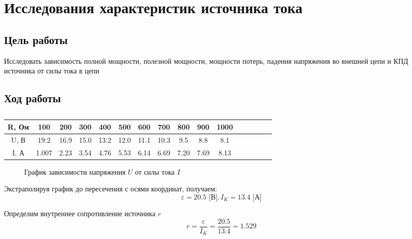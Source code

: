 \chapter{Исследования характеристик источника тока}

\section{Цель работы}
Исследовать зависимость полной мощности, полезной мощности, мощности потерь, падения напряжения во внешней цепи и КПД источника от силы тока в цепи

\section{Ход работы}

\begin{table}[h]
	\caption{}
	\centering
	\begin{tabular}{|c|c|c|c|c|c|c|c|c|c|c|c|c|c|c|c|}
		\hline
		R, Ом & 100 & 200 & 300 & 400 & 500 & 600 & 700 & 800 & 900 & 1000 \\ \hline
		U, В & 19.2 & 16.9 & 15.0 & 13.2 & 12.0 & 11.1 & 10.3 & 9.5 & 8.8 & 8.1 \\ \hline
		I, А & 1.007 & 2.23 & 3.54 & 4.76 & 5.53 & 6.14 & 6.69 & 7.20 & 7.69 & 8.13    \\ \hline
	\end{tabular}
\end{table}

\begin{figure}[h]
	\centering
	\caption{График зависимости напряжения $U$ от силы тока $I$}
\end{figure}

Экстраполируя график до пересечения с осями координат, получаем:
\[
\varepsilon = 20.5 \text{ [В]}, I_K = 13.4 \text{ [А]}
\]

Определим внутреннее сопротивление источника $r$
\[
r = \frac{\varepsilon}{I_K} = \frac{20.5}{13.4} = 1.529
\]

